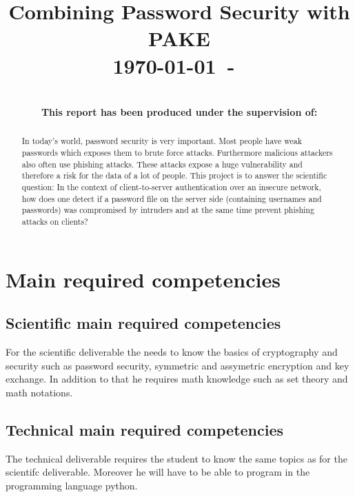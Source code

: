 \documentclass[conference,compsoc]{IEEEtran}
\begin{document}
\title{Combining Password Security with PAKE\\
{\small \today~-~\currenttime}}
 
\author{
\\
{\bf This report has been produced under the supervision of:}\\
%
}

\maketitle

\begin{abstract}

In today's world, password security is very important. Most people have weak
	passwords which exposes them to brute force attacks. Furthermore
	malicious attackers also often use phishing attacks. These attacks
	expose a huge vulnerability and therefore a risk for the data of a lot
	of people. This project is to answer the scientific question: In the
	context of client-to-server authentication over an insecure network,
	how does one detect if a password file on the server side (containing
	usernames and passwords) was compromised by intruders and at the same
	time prevent phishing attacks on clients?

\end{abstract}

\IEEEpeerreviewmaketitle

\section{Main required competencies } 

\subsection{Scientific main required competencies}
For the scientific deliverable the needs to know the basics of cryptography 
and security such as password security, symmetric and assymetric encryption and
key exchange. In addition to that he requires math knowledge such as set theory
and math notations.

\subsection{Technical main required competencies}
The technical deliverable requires the student to know the same topics as for
the scientifc deliverable. Moreover he will have to be able to program in the 
programming language python.
\end{document}

